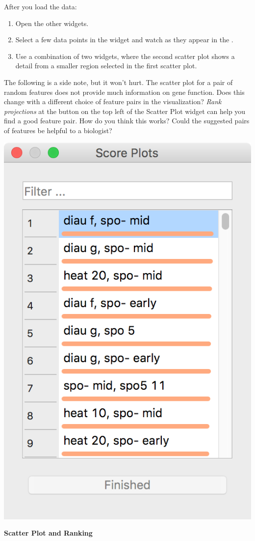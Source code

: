 After you load the data:
\begin{enumerate}
\item Open the other widgets.
\item Select a few data points in the  widget and watch as they appear in the .
\item Use a combination of two  widgets, where the second scatter plot shows a detail from a smaller region selected in the first scatter plot.
\end{enumerate}

The following is a side note, but it won't hurt. The scatter plot for a pair of random features does not provide much information on gene function. Does this change with a different choice of feature pairs in the visualization? \textit{Rank projections} at the button on the top left of the Scatter Plot widget can help you find a good feature pair. How do you think this works? Could the suggested pairs of features be helpful to a biologist?

\begin{marginfigure}[4cm]
  \includegraphics[width=0.9\linewidth]{score-plots.png}
  \caption{\textbf{\textsf{Scatter Plot and Ranking}}}
\end{marginfigure}

